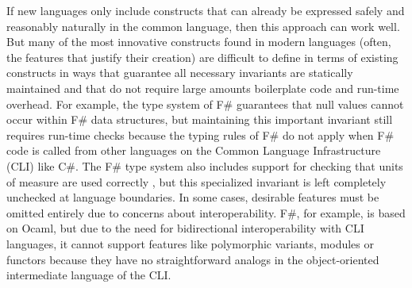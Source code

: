 If new languages only include constructs that can already be expressed safely and reasonably naturally in the common language, then this approach can work well.
But many of the most innovative constructs found in modern languages (often, the features that justify their creation) are difficult to define in terms of existing constructs in ways that guarantee all necessary invariants are statically maintained and that do not require large amounts boilerplate code and run-time overhead. For example, the type system of F\# guarantees that null values cannot occur within F\# data structures, but maintaining this important invariant still requires run-time checks because the typing rules of F\# do not apply when F\# code is called from other languages on the Common Language Infrastructure (CLI) like C\#. The F\# type system also includes support for checking that units of measure are used correctly \cite{syme2012expert, kennedy1994dimension}, but this specialized invariant is left completely unchecked at language boundaries. 
In some cases, desirable features must be omitted entirely due to concerns about  interoperability. F\#, for example, is based on Ocaml, but due to the need for bidirectional interoperability with CLI languages, it cannot support features like polymorphic variants, modules or functors \cite{ocaml-manual} because they have no straightforward analogs in the object-oriented intermediate language of the CLI.

